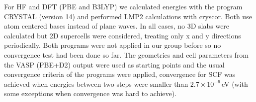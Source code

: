 \documentclass[11pt,DIV=13,BCOR=5mm,a4paper,headinclude]{scrbook}
\begin{document}
For HF and DFT (PBE and B3LYP) we calculated energies with the program CRYSTAL\cite{crystal14} (version 14) and performed LMP2 calculations with cryscor\cite{cryscor}.
Both use atom centered bases instead of plane waves.
In all cases, no 3D slabs were calculated but 2D supercells were considered, treating only x and y directions periodically.
Both programs were not applied in our group before so no convergence test had been done so far.
The geometries and cell parameters from the VASP (PBE+D2) output were used as starting points and the usual convergence criteria of the programs were applied, convergence for SCF was achieved when energies between two steps were smaller than $2.7\times 10^{-6}\,$eV (with some exceptions when convergence was hard to achieve).
\\\\

\end{document}
